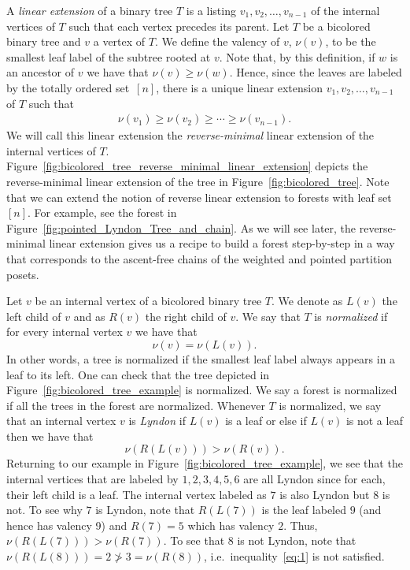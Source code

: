 A \emph{linear extension} of a binary tree $T$ is a listing $v_1,v_2, \dots,v_{n-1}$ of the internal vertices of $T$ such that each vertex precedes its parent. 
Let $T$ be a bicolored binary tree and $v$ a vertex of $T$. We define the valency of $v$, $\nu(v)$,  to be the smallest leaf label of the subtree rooted at $v$.  Note that, by this definition, if $w$ is an ancestor of $v$ we have that $\nu(v)\ge \nu(w)$. Hence, since the leaves are labeled by the totally ordered set~$[n]$, there is a unique linear extension $v_1,v_2,\dots,v_{n-1}$  of $T$ such that
\begin{align}\label{equation:reverse_minimal_le}
    \nu(v_1)\ge \nu(v_2) \ge \cdots \ge \nu(v_{n-1}).
\end{align}
We will call this linear extension the \emph{reverse-minimal} linear extension of the internal vertices of $T$. Figure~\ref{fig:bicolored_tree_reverse_minimal_linear_extension} depicts the reverse-minimal linear extension of the tree in Figure~\ref{fig:bicolored_tree}.     Note that we can extend the notion of reverse linear extension to forests with leaf set $[n]$.   For example, see the forest in Figure~\ref{fig:pointed_Lyndon_Tree_and_chain}. As we will see later, the reverse-minimal linear extension gives us a recipe to build  a forest  step-by-step in a way that corresponds to the ascent-free chains of the weighted and pointed partition posets. 

Let $v$ be an internal vertex of a bicolored binary tree $T$. We denote as $L(v)$ the left child of $v$ and as $R(v)$ the right child of $v$. 
We say that $T$ is \emph{normalized} if for every internal vertex $v$ we have that
\begin{equation}\label{equation:normalized}\tag{N}
    \nu(v)=\nu(L(v)).
\end{equation}
In other words, a tree is normalized if  the smallest leaf label always appears in a leaf to its left.  One can check that the tree depicted in Figure~\ref{fig:bicolored_tree_example} is normalized. We say a forest is normalized if all the trees in the forest are normalized. Whenever $T$ is normalized, we say that an internal vertex $v$ is \emph{Lyndon} if $L(v)$ is a leaf or else if $L(v)$ is not a leaf then we have that
 \begin{equation}\label{eq:1}\tag{L}
     \nu(R(L(v)))>\nu(R(v)).
 \end{equation}
 Returning to our example in Figure~\ref{fig:bicolored_tree_example}, we see that the internal vertices that are labeled by $1,2,3,4,5,6$ are all Lyndon since for each,  their left child is a leaf. The internal vertex labeled as $7$ is also Lyndon but $8$ is not. To see why $7$ is Lyndon, note that $R(L(7))$ is the leaf labeled $9$ (and hence has valency 9) and $R(7)=5$ which has valency $2$. Thus, $ \nu(R(L(7)))>\nu(R(7))$. To see that $8$ is not Lyndon, note that  $\nu(R(L(8)))=2\not> 3= \nu(R(8))$, i.e.~inequality~\ref{eq:1} is not satisfied.


